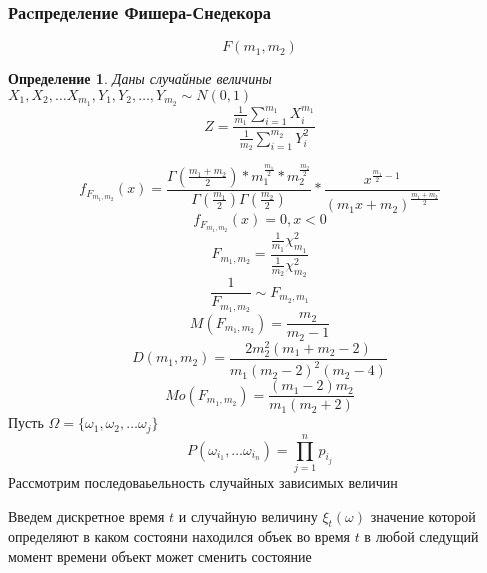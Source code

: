 \documentclass[14pt]{extarticle}
\newtheorem{definition}{Определение}
\begin{document}
\subsubsection{Раcпределение Фишера-Снедекора}
\begin{equation}
F(m_1,m_2)
\end{equation} 
\begin{definition}
	Даны случайные величины $X_1,X_2,\dots X_{m_1}, Y_1,Y_2,\dots,Y_{m_2} \sim N(0,1)$
	\begin{equation}
	Z = \frac{\frac{1}{m_1} \sum_{i=1}^{m_1} X_{i}^{m_1}}{\frac{1}{m_2} \sum_{i=1}^{m_2}Y^2_{i}}
	\end{equation} 
\end{definition}
\begin{equation}
f_{F_{m_1,m_2}}(x) =
\frac{\Gamma(\frac{m_1 + m_2}{2}) * m_1^{\frac{m_1}{2}}*m_2^{\frac{m_2}{2}}}{\Gamma(\frac{m_1}{2}) \Gamma(\frac{m_2}{2})}
* \frac{x^{\frac{m_1}{2} - 1}}{(m_1 x + m_2)^{\frac{m_1+m_2}{2}}}
\end{equation} 
\begin{equation}
	f_{F_{m_1,m_2}}(x) = 0 , x < 0
\end{equation} 
\begin{equation}
F_{m_1,m_2} = \frac{\frac{1}{m_1} \chi^2_{m_1}}{\frac{1}{m_2}\chi^2_{m_2}}
\end{equation} 
\begin{equation}
\frac{1}{F_{m_1,m_2}} \sim F_{m_2, m_1}
\end{equation} 
\begin{equation}
M(F_{m_1,m_2}) = \frac{m_2}{m_2-1}
\end{equation} 
\begin{equation}
D(m_1,m_2) = \frac{2m_2 ^2 (m_1 + m_2 - 2)}{m_1 (m_2 - 2) ^2 (m_2 - 4)}
\end{equation} 
\begin{equation}
Mo(F_{m_1,m_2}) = \frac{(m_1 - 2)m_2}{m_1 (m_2 + 2)}
\end{equation} 
Пусть $\Omega = \{\omega_1,\omega_2,\dots \omega_{j}\}$
\begin{equation}
P(\omega_{i_1},\dots \omega_{i_{n}}) = \prod_{j = 1}^{n} p_{i_{j}}
\end{equation} 
Рассмотрим последоваьельность
случайных зависимых  величин

Введем дискретное время $t$ и 
случайную величину  $\xi_{t}(\omega)$ 
значение которой определяют в каком состояни
находился объек во время $t$ 
 в любой следущий момент времени объект может сменить 
 состояние
\end{document}
